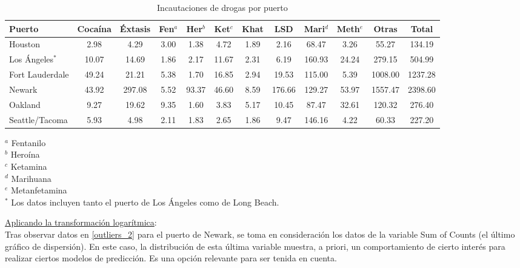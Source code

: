 \documentclass[12pt]{article}
\begin{document}
		\begingroup
		\small
		\begin{table}[H]
			\begin{center}
				\caption{Incautaciones de drogas por puerto}
				\label{tabla_incautaciones}
				\setlength{\tabcolsep}{1pt}
				\begin{tabular}{|l|c|c|c|c|c|c|c|c|c|c|c|}
					\hline
					\textbf{Puerto} & \textbf{Cocaína} & \textbf{Éxtasis} & \textbf{Fen$^a$} & \textbf{Her$^b$} & \textbf{Ket$^c$} & \textbf{Khat} & \textbf{LSD} & \textbf{Mari$^d$} & \textbf{Meth$^e$} & \textbf{Otras} & \textbf{Total} \\
					\hline
					Houston & 2.98 & 4.29 & 3.00 & 1.38 & 4.72 & 1.89 & 2.16 & 68.47 & 3.26 & 55.27 & 134.19 \\
					Los Ángeles$^*$ & 10.07 & 14.69 & 1.86 & 2.17 & 11.67 & 2.31 & 6.19 & 160.93 & 24.24 & 279.15 & 504.99 \\
					Fort Lauderdale & 49.24 & 21.21 & 5.38 & 1.70 & 16.85 & 2.94 & 19.53 & 115.00 & 5.39 & 1008.00 & 1237.28 \\
					Newark & 43.92 & 297.08 & 5.52 & 93.37 & 46.60 & 8.59 & 176.66 & 129.27 & 53.97 & 1557.47 & 2398.60 \\
					Oakland & 9.27 & 19.62 & 9.35 & 1.60 & 3.83 & 5.17 & 10.45 & 87.47 & 32.61 & 120.32 & 276.40 \\
					Seattle/Tacoma & 5.93 & 4.98 & 2.11 & 1.83 & 2.65 & 1.86 & 9.47 & 146.16 & 4.22 & 60.33 & 227.20 \\
					\hline
				\end{tabular}
			\end{center}
			$^a$ Fentanilo \\
			$^b$ Heroína \\
			$^c$ Ketamina \\ 
			$^d$ Marihuana \\
			$^e$ Metanfetamina \\
			$^*$ Los datos incluyen tanto el puerto de Los Ángeles como de Long Beach.
		\end{table}
		\endgroup
		
		\underline{Aplicando la transformación logarítmica}:\\
		Tras observar datos en \ref{outliers_2} para el puerto de Newark, se toma en consideración los datos de la variable Sum of Counts (el último gráfico de dispersión). En este caso, la distribución de esta última variable muestra, a priori, un comportamiento de cierto interés para realizar ciertos modelos de predicción. Es una opción relevante para ser tenida en cuenta.
		
\end{document}
